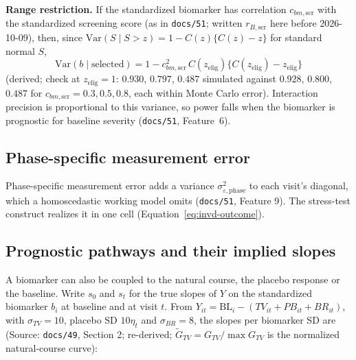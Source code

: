 \documentclass[11pt]{article}
\newcommand{\code}[1]{\texttt{#1}}
\begin{document}
\textbf{Range restriction.} If the standardized biomarker has
correlation $c_{bm,\text{scr}}$ with the standardized screening score
(as in \code{docs/51}; written $r_{B,\text{scr}}$ here before
2026-10-09), then, since
$\mathrm{Var}(S \mid S > z) = 1 - C(z)\{C(z) - z\}$ for standard
normal $S$,
\begin{equation}
\mathrm{Var}(b \mid \text{selected}) = 1 - c_{bm,\text{scr}}^2\,
  C(z_{\text{elig}})\{C(z_{\text{elig}}) - z_{\text{elig}}\}
\label{eq:pd-range}
\end{equation}
(derived; check at $z_{\text{elig}} = 1$: $0.930$, $0.797$, $0.487$ simulated
against $0.928$, $0.800$, $0.487$ for $c_{bm,\text{scr}} = 0.3, 0.5,
0.8$, each within Monte Carlo error). Interaction precision is
proportional to this variance, so power falls when the biomarker is
prognostic for baseline severity (\code{docs/51}, Feature~6).

\subsection{Phase-specific measurement error}
\label{sec:pd-me}

Phase-specific measurement error adds a variance
$\sigma^2_{\varepsilon,\text{phase}}$ to each visit's diagonal, which a
homoscedastic working model omits (\code{docs/51}, Feature 9). The
stress-test construct realizes it in one cell
(Equation~\eqref{eq:invd-outcome}).

\subsection{Prognostic pathways and their implied slopes}
\label{sec:bp-pathways}

A biomarker can also be coupled to the natural course, the placebo
response or the baseline. Write $s_0$ and $s_t$ for the true slopes of
$Y$ on the standardized biomarker $b_i$ at baseline and at visit $t$.
From $Y_{it} = \mathrm{BL}_i - (TV_{it} + PB_{it} + BR_{it})$, with
$\sigma_{TV} = 10$, placebo SD $10\eta_t$ and $\sigma_{BR} = 8$, the
slopes per biomarker SD are (Source: \code{docs/49}, Section 2;
re-derived; $\tilde G_{TV} = G_{TV}/\max G_{TV}$ is the normalized
natural-course curve):
\end{document}
